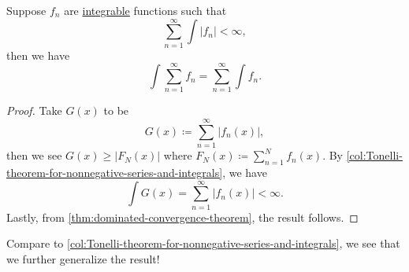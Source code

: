 \begin{corollary}\label{col:Tonelli-theorem-for-series-and-integrals}
	Suppose \(f_{n}\) are \hyperref[def:integrable]{integrable} functions such that
	\[
		\sum\limits_{n=1}^{\infty} \int \left\vert f_{n} \right\vert < \infty,
	\]
	then we have
	\[
		\int \sum\limits_{n=1}^{\infty} f_{n} = \sum\limits_{n=1}^{\infty} \int f_{n}.
	\]
\end{corollary}
\begin{proof}
	Take \(G(x)\) to be
	\[
		G(x) \coloneqq \sum\limits_{n=1}^{\infty} \left\vert f_{n}(x) \right\vert,
	\]
	then we see \(G(x) \geq \left\vert F_{N}(x) \right\vert\) where \(F_{N}(x) \coloneqq \sum\limits_{n=1}^{N} f_{n}(x)\).
	By \autoref{col:Tonelli-theorem-for-nonnegative-series-and-integrals}, we have
	\[
		\int G(x) = \sum\limits_{n=1}^{\infty} \left\vert f_{n}(x) \right\vert < \infty .
	\]
	Lastly, from \autoref{thm:dominated-convergence-theorem}, the result follows.
\end{proof}
\begin{remark}
	Compare to \autoref{col:Tonelli-theorem-for-nonnegative-series-and-integrals}, we see that we further generalize the result!
\end{remark}